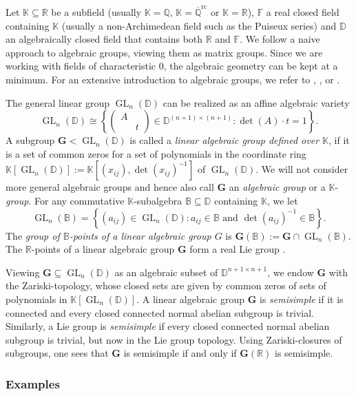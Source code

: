 \documentclass[12pt]{amsart}
\newcommand{\F}{\mathbb{F} }
\newcommand{\R}{\mathbb{R} }
\newcommand{\Q}{\mathbb{Q} }
\newcommand{\D}{\mathbb{D} }
\newcommand{\K}{\mathbb{K}}
\newcommand{\GLnB}{\operatorname{GL}_n(\mathbb{B}) }
\newcommand{\GLnD}{\operatorname{GL}_n(\D) }
\newcommand{\bG}{\mathbf{G}}
\numberwithin{equation}{section}
\theoremstyle{remark} %
\begin{document}
	 Let $\K \subseteq \R$ be a subfield (usually $\K = \Q$, $\K= \overline{\Q}^{\operatorname{rc}}$ or $\K = \R$), $\F$ a real closed field containing $\K$ (usually a non-Archimedean field such as the Puiseux series) and $\D$ an algebraically closed field that contains both $\R$ and $\F$. We follow a naive approach to algebraic groups, viewing them as matrix groups. Since we are working with fields of characteristic 0, the algebraic geometry can be kept at a minimum. For an extensive introduction to algebraic groups, we refer to \cite{Bor66}, \cite{Bor}, \cite{Hum1} or \cite{Zim}.
	 
	 The general linear group $\GLnD$ can be realized as an affine algebraic variety
	 $$
	 \GLnD \cong \left\{ \begin{pmatrix}
	 	A & \\ & t
	 \end{pmatrix} \in \D^{(n+1)\times(n+1)} \colon \det (A) \cdot t = 1 \right\}.
	 $$
	 A subgroup $\bG < \GLnD$ is called a \emph{linear algebraic group defined over $\K$}, if it is a set of common zeros for a set of polynomials in the coordinate ring $\K[\operatorname{GL}_n(\D)]:= \K[(x_{ij}), \det(x_{ij})^{-1}]$ of $\operatorname{GL}_n(\D)$. 
	 We will not consider more general algebraic groups and hence also call $\bG$ an \emph{algebraic group} or a $\K$-\emph{group}.
	 For any commutative $\K$-subalgebra $\mathbb{B} \subseteq \D$ containing $\K$, we let 
	 $$
	 \GLnB = \left\{ (a_{ij}) \in \GLnD \colon a_{ij} \in \mathbb{B} \text{ and } \det(a_{ij})^{-1} \in \mathbb{B} \right\}.
	 $$ 
	 The \emph{group of $\mathbb{B}$-points of a linear algebraic group $G$}
	 is $\bG(\mathbb{B}) := \bG \cap \GLnB$. The $\R$-points of a linear algebraic group $\bG$ form a real Lie group \cite[Theorem 2.1]{Mil13}. 
	 
	 Viewing $\bG \subseteq \GLnD $ as an algebraic subset of $\D^{n+1\times n+1}$, we endow $\bG$ with the Zariski-topology, whose closed sets are given by common zeros of sets of polynomials in $\K[\operatorname{GL}_n(\D)]$. A linear algebraic group $\bG$ is \emph{semisimple} if it is connected and every closed connected normal abelian subgroup is trivial. Similarly, a Lie group is \emph{semisimple} if every closed connected normal abelian subgroup is trivial, but now in the Lie group topology. Using Zariski-closures of subgroups, one sees that $\bG$ is semisimple if and only if $\bG(\R)$ is semisimple.
	 
	
	
 \subsubsection{Examples}
 
\end{document}
